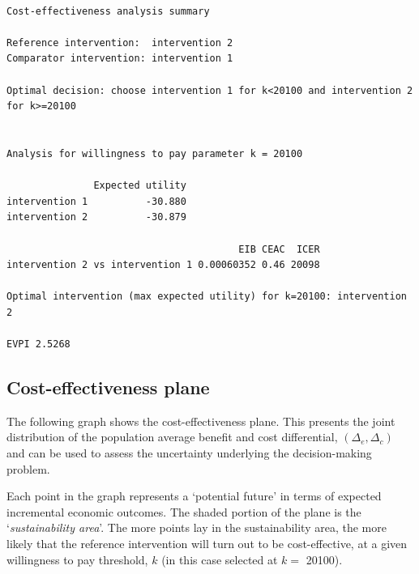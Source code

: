 \documentclass[]{article}
\newenvironment{Shaded}{\begin{snugshade}}{\end{snugshade}}
\newcommand{\ControlFlowTok}[1]{\textcolor[rgb]{0.13,0.29,0.53}{\textbf{#1}}}
\newcommand{\DataTypeTok}[1]{\textcolor[rgb]{0.13,0.29,0.53}{#1}}
\newcommand{\DecValTok}[1]{\textcolor[rgb]{0.00,0.00,0.81}{#1}}
\newcommand{\KeywordTok}[1]{\textcolor[rgb]{0.13,0.29,0.53}{\textbf{#1}}}
\newcommand{\NormalTok}[1]{#1}
\newcommand{\OperatorTok}[1]{\textcolor[rgb]{0.81,0.36,0.00}{\textbf{#1}}}
\newcommand{\OtherTok}[1]{\textcolor[rgb]{0.56,0.35,0.01}{#1}}
\newcommand{\StringTok}[1]{\textcolor[rgb]{0.31,0.60,0.02}{#1}}
\begin{document}
\begin{verbatim}

Cost-effectiveness analysis summary 

Reference intervention:  intervention 2
Comparator intervention: intervention 1

Optimal decision: choose intervention 1 for k<20100 and intervention 2 for k>=20100


Analysis for willingness to pay parameter k = 20100

               Expected utility
intervention 1          -30.880
intervention 2          -30.879

                                        EIB CEAC  ICER
intervention 2 vs intervention 1 0.00060352 0.46 20098

Optimal intervention (max expected utility) for k=20100: intervention 2
           
EVPI 2.5268
\end{verbatim}

\hypertarget{cost-effectiveness-plane}{%
\subsection{Cost-effectiveness plane}\label{cost-effectiveness-plane}}

The following graph shows the cost-effectiveness plane. This presents
the joint distribution of the population average benefit and cost
differential, \((\Delta_e,\Delta_c)\) and can be used to assess the
uncertainty underlying the decision-making problem.

Each point in the graph represents a `potential future' in terms of
expected incremental economic outcomes. The shaded portion of the plane
is the `\emph{sustainability area}'. The more points lay in the
sustainability area, the more likely that the reference intervention
will turn out to be cost-effective, at a given willingness to pay
threshold, \(k\) (in this case selected at \(k=\) 20100).

\begin{Shaded}
\end{Shaded}
\end{document}
